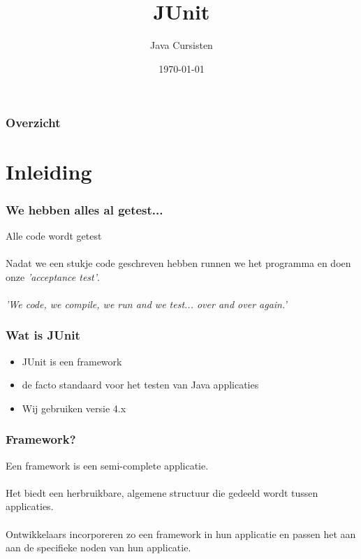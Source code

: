 \documentclass{beamer}
\title{JUnit}
\author{Java Cursisten}
\institute{INTEC Brussel}
\date{\today}
\begin{document}
\begin{frame}

\titlepage

\end{frame}


\begin{frame}

\frametitle{Overzicht}
\tableofcontents

\end{frame}


\section{Inleiding}


\begin{frame}

\frametitle{We hebben alles al getest...}

{\Large Alle code wordt getest\\~\\
Nadat we een stukje code geschreven hebben runnen we het programma en doen onze \textit{'acceptance test'}.\\~\\
\textit{'We code, we compile, we run and we test... over and over again.'}}

\end{frame}


\begin{frame}

\frametitle{Wat is JUnit}

\begin{itemize}

\item {\LARGE JUnit is een framework}
\item {\LARGE de facto standaard voor het testen van Java applicaties}
\item {\LARGE Wij gebruiken versie 4.x}

\end{itemize}

\end{frame}

\begin{frame}

\frametitle{Framework?}

{\Large Een framework is een semi-complete applicatie.\\~\\
Het biedt een herbruikbare, algemene structuur die gedeeld wordt tussen applicaties.\\~\\
Ontwikkelaars incorporeren zo een framework in hun applicatie en passen het aan aan de
specifieke noden van hun applicatie.}

\end{frame}
\end{document}
